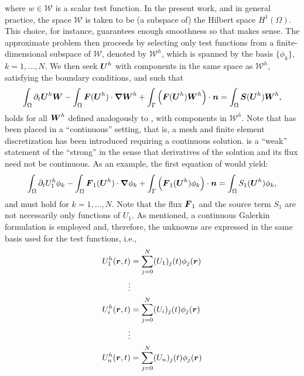 where $w \in \mathcal{W}$ is a scalar test function.  In the present
work, and in general practice, the space $\mathcal{W}$ is taken to be
(a subspace of) the Hilbert space $H^1(\Omega)$. This choice, for
instance, guarantees enough smoothness so that 
makes sense.
%
The approximate problem then proceeds by selecting only test functions
from a finite-dimensional subspace of $\mathcal{W}$, denoted by
$\mathcal {W}^h$, which is spanned by the basis $\{\phi_k\}$,
$k=1,\ldots,N$.  We then seek $\boldsymbol U^h$ with components in the same
space as $\mathcal{W}^h$, satisfying the boundary conditions, and such
that
\begin{align}
  \label{en:va_system_weak3}
  \int_\Omega \partial_t \boldsymbol U^h \boldsymbol W -   \int_\Omega \boldsymbol F(\boldsymbol U^h) \cdot \boldsymbol{\nabla} \boldsymbol W^h 
+ \int_\Gamma \left( \boldsymbol F(\boldsymbol U^h)  \boldsymbol W^h \right) \cdot \boldsymbol n   =  \int_{\Omega}  \boldsymbol S(\boldsymbol U^h)  \boldsymbol W^h,
\end{align}
holds for all $\boldsymbol W^h$ defined analogously to ,
with components in $\mathcal{W}^h$. Note that 
has been placed in a ``continuous'' setting, that is, a mesh and finite element
discretization has been introduced requiring a continuous solution.  
 is a ``weak'' statement of the ``strong'' 
 in the sense that derivatives of the  
solution and its flux need not be continuous. 
As an example, the first equation of  would yield:
%
\begin{align}
  \label{en:va_system_weak4}
  \int_\Omega \partial_t U_1^h \phi_k -   \int_\Omega \boldsymbol F_1(\boldsymbol U^h) \cdot \boldsymbol{\nabla} \phi_k 
+ \int_\Gamma \left( \boldsymbol F_1(\boldsymbol U^h) \phi_k \right) \cdot \boldsymbol n   =  \int_{\Omega} S_1(\boldsymbol U^h) \phi_k,
\end{align}
%
and must hold for $k=1,\ldots,N$. Note that the flux $\boldsymbol F_1$ and the source term $S_1$ are not necessarily only functions of $U_1$.
As mentioned, a continuous
Galerkin formulation is employed and, therefore, the unknowns are expressed in
the same basis used for the test functions, i.e.,
\begin{align}\label{en:va_system_weak4b}
  U_1^h(\boldsymbol r, t) &= \sum_{j=0}^N (U_1)_j(t) \phi_j(\boldsymbol r)
  \\
    \vdots  \nonumber\\
  U_i^h(\boldsymbol r, t) &= \sum_{j=0}^N (U_i)_j(t) \phi_j(\boldsymbol r)
  \\
  \vdots  \nonumber\\
  U_n^h(\boldsymbol r, t) &= \sum_{j=0}^N (U_n)_j(t) \phi_j(\boldsymbol r)
\end{align}

